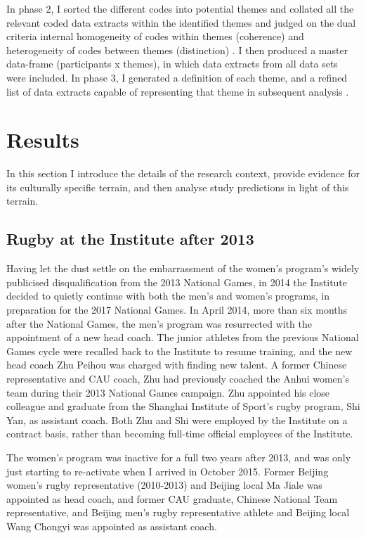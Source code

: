   In phase 2, I sorted the different codes into potential themes and collated all the relevant coded data extracts within the identified themes and judged on the dual criteria internal homogeneity of codes within themes (coherence) and heterogeneity of codes between themes (distinction) \citep{Patton1990}.  I then produced a master data-frame (participants x themes), in which data extracts from all data sets were included.  In phase 3, I generated a definition of each theme, and a refined list of data extracts capable of representing that theme in subsequent analysis \citep{Braun2006}.









  \section{Results}

  In this section I introduce the details of the research context, provide evidence for its culturally specific terrain, and then analyse study predictions in light of this terrain.

  \subsection{Rugby at the Institute after 2013}
  Having let the dust settle on the embarrassment of the women's program's widely publicised disqualification from the 2013 National Games, in 2014 the Institute decided to quietly continue with both the men's and women's programs, in preparation for the 2017 National Games.  In April 2014, more than six months after the National Games, the men's program was resurrected with the appointment of a new head coach. The junior athletes from the previous National Games cycle were recalled back to the Institute to resume training, and the new head coach Zhu Peihou was charged with finding new talent. A former Chinese representative and CAU coach, Zhu had previously coached the Anhui women's team during their 2013 National Games campaign.  Zhu appointed his close colleague and graduate from the Shanghai Institute of Sport's rugby program, Shi Yan, as assistant coach.  Both Zhu and Shi were employed by the Institute on a contract basis, rather than becoming full-time official employees of the Institute.

  The women's program was inactive for a full two years after 2013, and was only just starting to re-activate when I arrived in October 2015.  Former Beijing women's rugby representative (2010-2013) and Beijing local Ma Jiale was appointed as head coach, and former CAU graduate, Chinese National Team representative, and Beijing men's rugby representative athlete and Beijing local Wang Chongyi was appointed as assistant coach.


